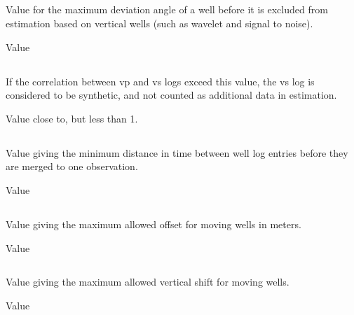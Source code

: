 \subsection{}
 \slist
   \item \Description Value for the maximum deviation angle of a well before it is excluded from estimation based on vertical wells (such as wavelet and signal to noise).
   \item \Argument Value
   \item {}
 \elist

\subsection{}
 \slist
   \item \Description If the correlation between vp and vs logs exceed this value, the vs log is considered to be synthetic, and not counted as additional data in estimation.
   \item \Argument Value close to, but less than 1.
   \item {}
 \elist

\subsection{}
 \slist
   \item \Description Value giving the minimum distance in time between well log entries before they are merged to one observation.
   \item \Argument Value
   \item {}
 \elist

\subsection{}
 \slist
   \item \Description Value giving the maximum allowed offset for moving wells in meters.
   \item \Argument Value
   \item {}
 \elist

\subsection{}
 \slist
   \item \Description Value giving the maximum allowed vertical shift for moving wells.
   \item \Argument Value
   \item {}
 \elist

